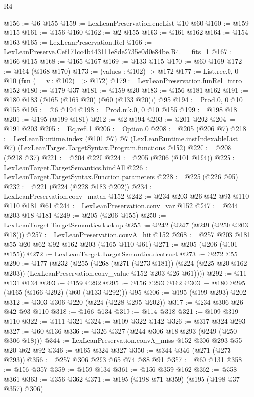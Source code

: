 \begin{lexlean}{R4}
\begin{coremodule}
@156 := @6 @155
@159 := LexLeanPreservation.encList @10 @60
@160 := @159 @115
@161 := @156 @160
@162 := @2 @155
@163 := @161 @162
@164 := @154 @163
@165 := LexLeanPreservation.Rel
@166 := LexLeanPreserve.Cef171cc4b443111e8de2735e0d0e84be.R4.__fits_1
@167 := @166 @115
@168 := @165 @167
@169 := @133 @115
@170 := @60 @169
@172 := @164 (@168 @170)
@173 := (values : @102) -> @172
@177 := List.rec.{0, 0} @10 (fun (__v : @102) => @172)
@179 := LexLeanPreservation.funRel_intro @152
@180 := @179 @37
@181 := @159 @20
@183 := @156 @181 @162
@191 := @180 @183 (@165 (@166 @20) (@60 (@133 @20))) @95
@194 := Prod.{0, 0} @10 @155
@195 := @6 @194
@198 := Prod.mk.{0, 0} @10 @155
@199 := @198 @18
@201 := @195 (@199 @181)
@202 := @2 @194
@203 := @201 @202
@204 := @191 @203
@205 := Eq.refl.{1}
@206 := Option.{0}
@208 := @205 (@206 @7)
@218 := LexLeanRuntime.index
    (@101 @7)
    @7
    (LexLeanRuntime.instIndexableList @7)
    (LexLeanTarget.TargetSyntax.Program.functions @152)
@220 := @208 (@218 @37)
@221 := @204 @220
@224 := @205 (@206 (@101 @194))
@225 := LexLeanTarget.TargetSemantics.bindAll
@226 := LexLeanTarget.TargetSyntax.Function.parameters
@228 := @225 (@226 @95)
@232 := @221 (@224 (@228 @183 @202))
@234 := LexLeanPreservation.conv_match @152
@242 := @234 @203 @26 @42 @93 @110 @110 @181 @61
@244 := LexLeanPreservation.conv_var @152
@247 := @244 @203 @18 @181
@249 := @205 (@206 @155)
@250 := LexLeanTarget.TargetSemantics.lookup
@255 := @242 (@247 (@249 (@250 @203 @18)))
@257 := LexLeanPreservation.convA_hit @152
@268 := @257 @203 @181 @55 @20 @62 @92 @162 @203 (@165 @110 @61)
@271 := @205 (@206 (@101 @155))
@272 := LexLeanTarget.TargetSemantics.destruct
@273 := @272 @55
@290 := @177
    (@232
      (@255
        (@268
          (@271 (@273 @181))
          (@224 (@225 @20 @162 @203))
          (LexLeanPreservation.conv_value @152 @203 @26 @61))))
@292 := @11 @131 @134
@293 := @159 @292
@295 := @156 @293 @162
@303 := @180 @295 (@165 (@166 @292) (@60 (@133 @292))) @95
@306 := @195 (@199 @293) @202
@312 := @303 @306 @220 (@224 (@228 @295 @202))
@317 := @234 @306 @26 @42 @93 @110
@318 := @166 @134
@319 := @114 @318
@321 := @109 @319 @110
@322 := @111 @321
@324 := @109 @322 @142
@326 := @317 @324 @293
@327 := @60 @136
@336 := @326 @327 (@244 @306 @18 @293 (@249 (@250 @306 @18)))
@344 := LexLeanPreservation.convA_miss @152 @306 @293 @55 @20 @62 @92
@346 := @165 @324 @327
@350 := @344 @346 (@271 (@273 @293))
@356 := @257 @306 @293 @65 @74 @88 @91
@357 := @60 @131
@358 := @156 @357
@359 := @159 @134
@361 := @156 @359 @162
@362 := @358 @361
@363 := @356 @362
@371 := @195 (@198 @71 @359) (@195 (@198 @37 @357) @306)

\end{coremodule}
\end{lexlean}
